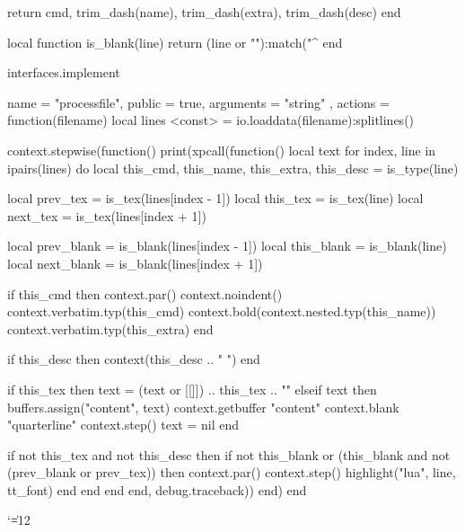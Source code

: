        return cmd, trim_dash(name), trim_dash(extra), trim_dash(desc)
    end

    local function is_blank(line)
        return (line or ""):match("^%
    end

    interfaces.implement {
        name = "processfile",
        public = true,
        arguments = { "string" },
        actions = function(filename)
            local lines <const> = io.loaddata(filename):splitlines()

            context.stepwise(function() print(xpcall(function()
                local text
                for index, line in ipairs(lines) do
                    local this_cmd, this_name, this_extra, this_desc = is_type(line)

                    local prev_tex = is_tex(lines[index - 1])
                    local this_tex = is_tex(line)
                    local next_tex = is_tex(lines[index + 1])

                    local prev_blank = is_blank(lines[index - 1])
                    local this_blank = is_blank(line)
                    local next_blank = is_blank(lines[index + 1])

                    if this_cmd then
                        context.par()
                        context.noindent()
                        context.verbatim.typ(this_cmd)
                        context.bold(context.nested.typ(this_name))
                        context.verbatim.typ(this_extra)
                    end

                    if this_desc then
                        context(this_desc .. " ")
                    end

                    if this_tex then
                        text = (text or [[\noindent ]]) .. this_tex .. "\n"
                    elseif text then
                        buffers.assign("content", text)
                        context.getbuffer { "content" }
                        context.blank { "quarterline" }
                        context.step()
                        text = nil
                    end

                    if not this_tex and not this_desc then
                        if not this_blank or
                           (this_blank and not (prev_blank or prev_tex))
                        then
                            context.par()
                            context.step()
                            highlight("lua", line, tt_font)
                        end
                    end
                end
            end, debug.traceback)) end)
        end
    }
\stopluacode

\setuphead[subsection][
    alternative=normal,
    style=\ssbfa,
    after={\blank[disable, penalty:10000]},
    continue=yes,
]

\catcode`\|=12

\startdocument[
    title=luatools,
    author=Max Chernoff,
    version=0.0.0, %
    github=https://github.com/gucci-on-fleek/luatools,
]
    \subject{Contents}
    \placecontent[criterium=all]

\stopdocument
